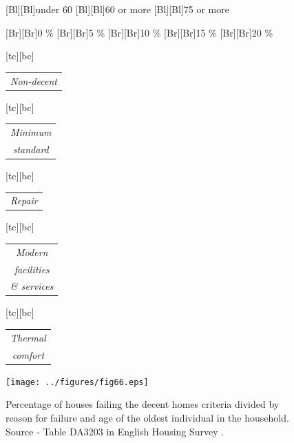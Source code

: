 \documentclass[11 pt, a4paper]{report}
\renewcommand{\arraystretch}{1.2}
\begin{document}
\clearpage


%

%
\begin{figure}[hbtp!]
\centering
{}[Bl][Bl]{\small{under 60}}
[Bl][Bl]{\small{60 or more}}
[Bl][Bl]{\small{75 or more}}

[Br][Br]{\small{0 \%}}
[Br][Br]{\small{5 \%}}
[Br][Br]{\small{10 \%}}
[Br][Br]{\small{15 \%}}
[Br][Br]{\small{20 \%}}

\renewcommand{\arraystretch}{0.7}
[tc][bc]{\scriptsize{
\begin{tabular}{c}
\emph{Non-decent}\\
\end{tabular}
}}
[tc][bc]{\scriptsize{
\begin{tabular}{c}
\emph{Minimum}\\
\emph{standard}
\end{tabular}
}}
[tc][bc]{\scriptsize{
\begin{tabular}{c}
\emph{Repair}\\
\end{tabular}
}}
[tc][bc]{\scriptsize{
\begin{tabular}{c}
\emph{Modern}\\
\emph{facilities}\\
\emph{\& services}
\end{tabular}
}}
[tc][bc]{\scriptsize{
\begin{tabular}{c}
\emph{Thermal}\\
\emph{comfort}
\end{tabular}
}}
\texttt{[image: ../figures/fig66.eps]}
\caption{Percentage of houses failing the decent homes criteria divided by reason for failure and age of the oldest individual in the household. Source - Table DA3203 in English Housing Survey \citep{DCLG2013}.
}\label{Fig:66} %
\end{figure}
\end{document}
